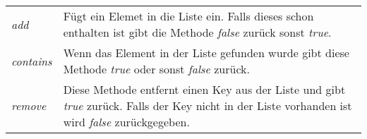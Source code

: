 \documentclass[10pt,a4paper,titlepage,oneside]{article}
\begin{document}
\begin{table}[H]
    \begin{tabularx}{\textwidth}{lX}
        \textit{add} & Fügt ein Elemet in die Liste ein. Falls dieses schon enthalten ist gibt die Methode \textit{false} zurück sonst \textit{true}. \\
        \textit{contains} & Wenn das Element in der Liste gefunden wurde gibt diese Methode \textit{true} oder sonst \textit{false} zurück. \\
        \textit{remove} & Diese Methode entfernt einen Key aus der Liste und gibt \textit{true} zurück. Falls der Key nicht in der Liste vorhanden ist wird \textit{false} zurückgegeben. \\
    \end{tabularx}
\end{table}







 
 




		
\end{document}
